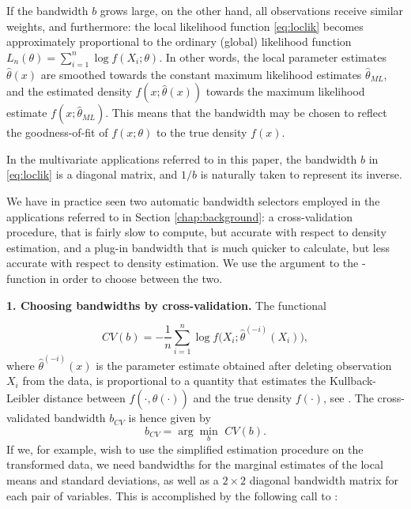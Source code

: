 If the bandwidth \(b\) grows large, on the other hand, all observations receive similar weights, and furthermore: the local likelihood function \eqref{eq:loclik} becomes approximately proportional to the ordinary (global) likelihood function \(L_n\left(\theta\right) = \sum_{i=1}^n\log f\left(X_i;\theta\right)\). In other words, the local parameter estimates \(\widehat \theta\left(x\right)\) are smoothed towards the constant maximum likelihood estimates \(\widehat\theta_{ML}\), and the estimated density \(f\left(x;\widehat\theta\left(x\right)\right)\) towards the maximum likelihood estimate \(f\left(x;\widehat\theta_{ML}\right)\). This means that the bandwidth may be chosen to reflect the goodness-of-fit of \(f\left(x;\theta\right)\) to the true density \(f\left(x\right)\).

In the multivariate applications referred to in this paper, the bandwidth \(b\) in \eqref{eq:loclik} is a diagonal matrix, and \(1/b\) is
naturally taken to represent its inverse. 

We have in practice seen two automatic bandwidth selectors employed in the applications referred to in Section \ref{chap:background}: a
cross-validation procedure, that is fairly slow to compute, but accurate with respect to density estimation, and a plug-in bandwidth that is much quicker to calculate, but less accurate with respect to density estimation. We use the argument
 to the -function in order to choose between the two.

\textbf{1. Choosing bandwidths by cross-validation.} The functional

\[CV\left(b\right) = -\frac{1}{n}\sum_{i=1}^n \log f\Big(X_i; \widehat\theta^{\left(-i\right)}\left(X_i\right)\Big),\]
where \(\widehat\theta^{\left(-i\right)}\left(x\right)\) is the parameter estimate obtained after deleting observation \(X_i\) from the data, is proportional to a quantity that estimates the Kullback-Leibler distance between \(f\left(\cdot, \widehat\theta\left(\cdot\right)\right)\) and the true density \(f\left(\cdot\right)\), see \cite{bere:tjos:2014}. The cross-validated bandwidth \(b_{CV}\) is hence given by \[b_{CV} = \arg\min_b \,\, CV\left(b\right).\] If we, for example, wish to use the simplified estimation procedure on the transformed data, we need bandwidths for the marginal estimates of the local means and standard deviations, as well as a \(2\times2\) diagonal bandwidth matrix for each pair of variables. This is accomplished by the following call to :

